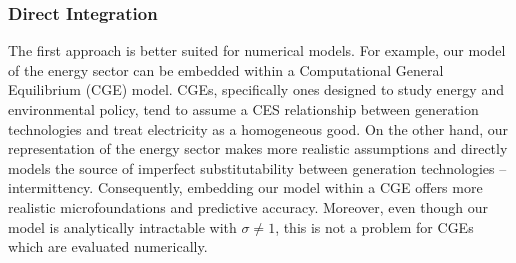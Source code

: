 \documentclass[11pt,a4paper]{extarticle}
\begin{document}
\subsubsection{Direct Integration}

The first approach is better suited for numerical models. For example, our model of the energy sector can be embedded within a Computational General Equilibrium (CGE) model. CGEs, specifically ones designed to study energy and environmental policy, tend to assume a CES relationship between generation technologies and treat electricity as a homogeneous good. On the other hand, our representation of the energy sector makes more realistic assumptions and directly models the source of imperfect substitutability between generation technologies -- intermittency. Consequently, embedding our model within a CGE offers more realistic microfoundations and predictive accuracy. Moreover, even though our model is analytically intractable with $\sigma \neq 1$, this is not a problem for CGEs which are evaluated numerically. 
\end{document}
